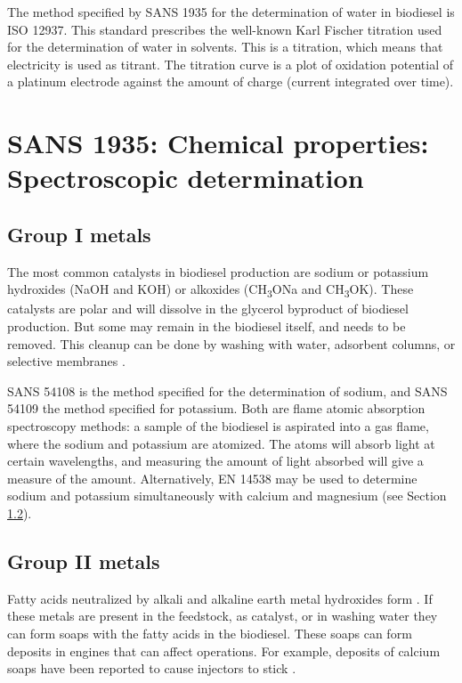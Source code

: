 The method specified by SANS 1935 for the determination of water in biodiesel is
ISO 12937. This standard prescribes the well-known Karl Fischer titration used
for the determination of water in solvents. This is a 
titration, which means that electricity is used as titrant. The titration curve
is a plot of oxidation potential of a platinum electrode against the amount of
charge (current integrated over time). 



\section{SANS 1935: Chemical properties: Spectroscopic determination}

\subsection{Group I metals}

The most common catalysts in biodiesel production are sodium or potassium
hydroxides (NaOH and KOH) or alkoxides (CH\textsubscript{3}ONa and
CH\textsubscript{3}OK). These catalysts are polar and will dissolve in the
glycerol byproduct of biodiesel production. But some may remain in the biodiesel
itself, and needs to be removed. This cleanup can be done by washing with water,
adsorbent columns, or selective membranes \autocite{Atadashi2011}.

SANS 54108 is the method specified for the determination of sodium, and SANS
54109 the method specified for potassium. Both are flame atomic absorption
spectroscopy methods: a sample of the biodiesel is aspirated into a gas flame,
where the sodium and potassium are atomized. The atoms will absorb light at
certain wavelengths, and measuring the amount of light absorbed will give a
measure of the amount. Alternatively, EN 14538 may be used to determine sodium
and potassium simultaneously with calcium and magnesium (see Section
\ref{sec:GroupIIMetals}).

\subsection{Group II metals}
\label{sec:GroupIIMetals}

Fatty acids neutralized by alkali and alkaline earth metal hydroxides form
. If these metals are present in the feedstock, as catalyst, or
in washing water they can form soaps with the fatty acids in the biodiesel.
These soaps can form deposits in engines that can affect operations. For
example, deposits of calcium soaps have been reported to cause injectors to
stick \autocite{Pischinger2000}.

